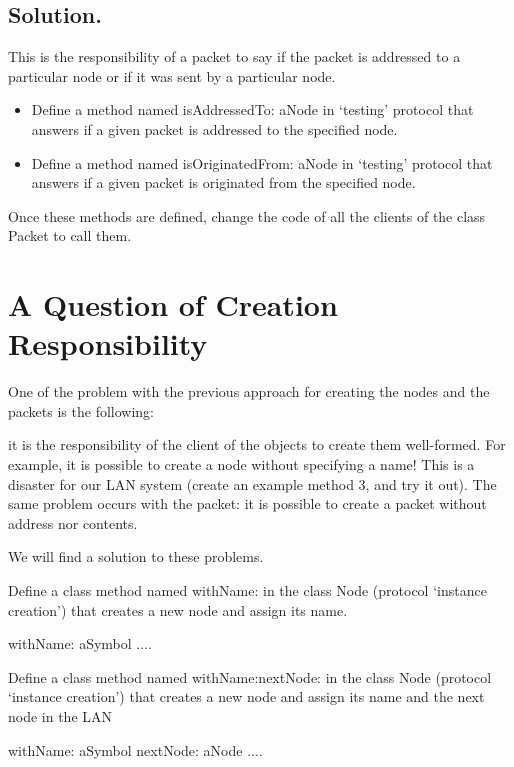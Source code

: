 \subsection{Solution.}

This is the responsibility of a packet to say if the packet is 
addressed to a particular node or if it was sent by a particular 
node.
\begin{itemize}
\item Define a method named isAddressedTo: aNode in `testing' protocol 
that answers if a given packet is addressed to the specified 
node. 
\item Define a method named isOriginatedFrom: aNode in `testing' protocol 
that answers if a given packet is originated from the specified 
node. 
\end{itemize}
Once these methods are defined, change the code of all the clients 
of the class Packet to call them.




\section{A Question of Creation Responsibility}


One of the problem with the previous approach for creating the 
nodes and the packets is the following:

it is the responsibility of the client of the objects to create 
them well-formed. For example, it is possible to create a node 
without specifying a name! This is a disaster for our LAN system 
(create an example method 3, and try it out). The same problem 
occurs with the packet: it is possible to create a packet without 
address nor contents.

We will find a solution to these problems.

\exercise  Define a class method named withName: in the class Node 
(protocol `instance creation') that creates a new node and assign 
its name.

\begin{code}
withName: aSymbol
....

\end{code}

Define a class method named withName:nextNode: in the class Node 
(protocol `instance creation') that creates a new node and assign 
its name and the next node in the LAN

\begin{code}
withName: aSymbol nextNode: aNode
....
\end{code}

